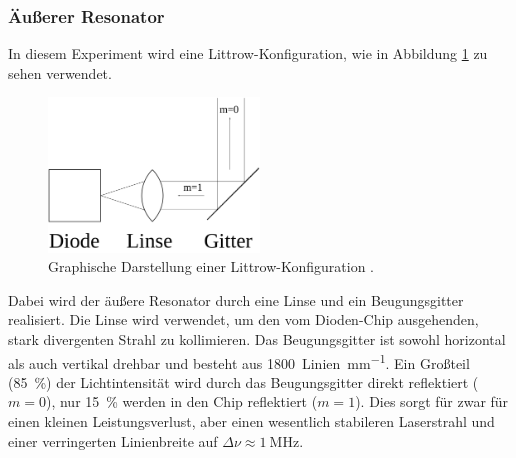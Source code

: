 \subsubsection{Äußerer Resonator}
In diesem Experiment wird eine Littrow-Konfiguration, wie in Abbildung \ref{Littrow}
zu sehen verwendet.
\begin{figure}[htb]
  \centering
  \includegraphics[width=0.5\textwidth]{images/Littrow-Konfig.pdf}
  \caption{Graphische Darstellung einer Littrow-Konfiguration \cite{Littrow-Konfig}.}
  \label{Littrow}
\end{figure}

Dabei wird der äußere Resonator durch eine Linse
und ein Beugungsgitter realisiert. Die Linse wird
verwendet, um den vom Dioden-Chip ausgehenden, stark divergenten Strahl zu
kollimieren. Das Beugungsgitter ist sowohl horizontal als auch vertikal drehbar
und besteht aus \SI{1800}{Linien\per\milli\meter}.
Ein Großteil (\SI{85}{\percent}) der Lichtintensität wird durch das Beugungsgitter
direkt reflektiert ($m=\num{0}$), nur \SI{15}{\percent} werden in den Chip reflektiert
($m=\num{1}$). Dies sorgt für zwar für einen kleinen Leistungsverlust, aber einen
wesentlich stabileren Laserstrahl und einer verringerten Linienbreite auf
$\Delta\nu\approx\SI{1}{\mega\hertz}$.


